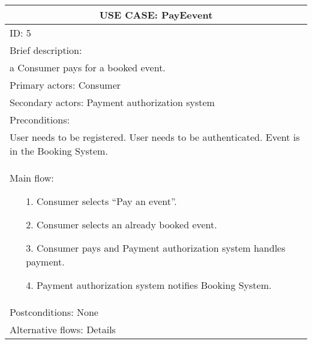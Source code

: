 \documentclass{article}
\begin{document}
\begin{table}[h!]
	\centering
	\begin{tabular}{|p{10cm}|}
		\hline
		\multicolumn{1}{|c|}{\textbf{USE CASE: PayEevent}}\\
		\hline
		ID: 5\\
		\hline
		Brief description:\\a Consumer pays for a booked event.\\
		\hline
		Primary actors: Consumer \\
		\hline
		Secondary actors: Payment authorization system \\
		\hline
		Preconditions:\\User needs to be registered. User needs to be authenticated. Event is in the Booking System.\\
		\hline
		Main flow:
		\vspace{-0.5\baselineskip}
		\begin{itemize}[leftmargin=1.2em]
			\item[1.] Consumer selects “Pay an event”.
			\vspace{-0.5\baselineskip}
			\item[2.] Consumer selects an already booked event.
			\vspace{-0.5\baselineskip}
			\item[3.] Consumer pays and Payment authorization system handles payment.
			\vspace{-0.5\baselineskip}
			\item[4.] Payment authorization system notifies Booking System.
		\end{itemize}
		\vspace{-1.5\baselineskip}
		\\
		\hline
		Postconditions: None \\
		\hline
		Alternative flows: Details \\
		\hline
	\end{tabular}
\end{table}
\end{document}
